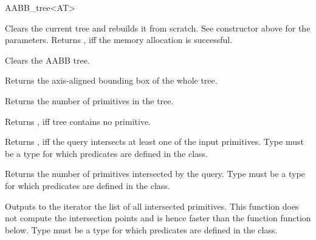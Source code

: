 \begin{ccRefClass}{AABB_tree<AT>}
\ccOperations

{Clears the current tree and rebuilds it from scratch. See constructor above for the parameters. Returns , iff the memory allocation is successful. }

{Clears the AABB tree. }

{Returns the axis-aligned bounding box of the whole tree. }

{Returns the number of primitives in the tree. }

{Returns , iff tree contains no primitive. }


{Returns , iff the query intersects at least one of the input primitives. Type  must be a type for which  predicates are defined in the  class.}
	
{Returns the number of primitives intersected by the query. Type  must be a type for which  predicates are defined in the  class.}


{Outputs to the iterator the list of all intersected primitives. This function does not compute the intersection points and is hence faster than the function  function below. Type  must be a type for which  predicates are defined in the  class.}


\end{ccRefClass}
